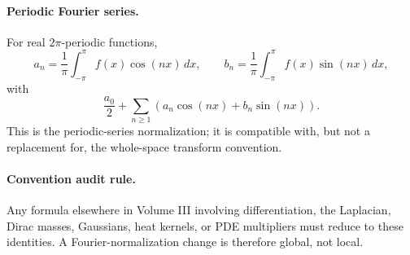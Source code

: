 \paragraph{Periodic Fourier series.}
For real \(2\pi\)-periodic functions,
\[
a_n=\frac1\pi\int_{-\pi}^{\pi}f(x)\cos(nx)\,dx,\qquad
b_n=\frac1\pi\int_{-\pi}^{\pi}f(x)\sin(nx)\,dx,
\]
with
\[
\frac{a_0}{2}+\sum_{n\ge1}(a_n\cos(nx)+b_n\sin(nx)).
\]
This is the periodic-series normalization; it is compatible with, but not a
replacement for, the whole-space transform convention.

\paragraph{Convention audit rule.}
Any formula elsewhere in Volume III involving differentiation, the Laplacian,
Dirac masses, Gaussians, heat kernels, or PDE multipliers must reduce to these
identities. A Fourier-normalization change is therefore global, not local.
